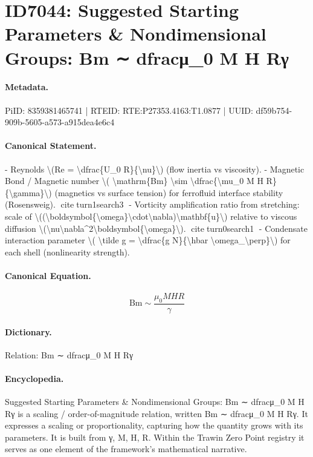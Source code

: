 \section*{ID7044: Suggested Starting Parameters \& Nondimensional Groups: Bm ∼ dfracμ\_0 M H Rγ}
\paragraph{Metadata.}
PiID: 8359381465741 | RTEID: RTE:P27353.4163:T1.0877 | UUID: df59b754-909b-5605-a573-a915dea4e6c4

\paragraph{Canonical Statement.}
- Reynolds \textbackslash{}(Re = \textbackslash{}dfrac\{U\_0 R\}\{\textbackslash{}nu\}\textbackslash{}) (flow inertia vs viscosity). - Magnetic Bond / Magnetic number \textbackslash{}( \textbackslash{}mathrm\{Bm\} \textbackslash{}sim \textbackslash{}dfrac\{\textbackslash{}mu\_0 M H R\}\{\textbackslash{}gamma\}\textbackslash{}) (magnetics vs surface tension) for ferrofluid interface stability (Rosensweig). citeturn1search3 - Vorticity amplification ratio from stretching: scale of \textbackslash{}((\textbackslash{}boldsymbol\{\textbackslash{}omega\}\textbackslash{}cdot\textbackslash{}nabla)\textbackslash{}mathbf\{u\}\textbackslash{}) relative to viscous diffusion \textbackslash{}(\textbackslash{}nu\textbackslash{}nabla\textasciicircum{}2\textbackslash{}boldsymbol\{\textbackslash{}omega\}\textbackslash{}). citeturn0search1 - Condensate interaction parameter \textbackslash{}( \textbackslash{}tilde g = \textbackslash{}dfrac\{g N\}\{\textbackslash{}hbar \textbackslash{}omega\_\textbackslash{}perp\}\textbackslash{}) for each shell (nonlinearity strength).

\paragraph{Canonical Equation.}
\[
\mathrm{Bm} \sim \dfrac{\mu_0 M H R}{\gamma}
\]

\paragraph{Dictionary.}
Relation: Bm ∼ dfracμ\_0 M H Rγ

\paragraph{Encyclopedia.}
Suggested Starting Parameters \& Nondimensional Groups: Bm ∼ dfracμ\_0 M H Rγ is a scaling / order-of-magnitude relation, written Bm ∼ dfracμ\_0 M H Rγ. It expresses a scaling or proportionality, capturing how the quantity grows with its parameters. It is built from γ, M, H, R. Within the Trawin Zero Point registry it serves as one element of the framework's mathematical narrative.
